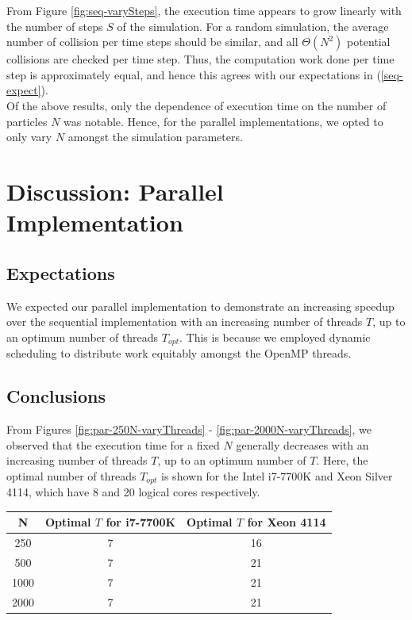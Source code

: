 \documentclass[12pt]{article}
\begin{document}
From Figure \ref{fig:seq-varySteps}, the execution time appears to grow linearly with the number of steps $S$ of the simulation. For a random simulation, the average number of collision per time steps should be similar, and all $\Theta(N^2)$ potential collisions are checked per time step. Thus, the computation work done per time step is approximately equal, and hence this agrees with our expectations in (\ref{seq-expect}). \label{seq-linear-growth-steps} \\

Of the above results, only the dependence of execution time on the number of particles $N$ was notable. Hence, for the parallel implementations, we opted to only vary $N$ amongst the simulation parameters.

\pagebreak

\section{Discussion: Parallel Implementation}

\subsection{Expectations}

We expected our parallel implementation to demonstrate an increasing speedup over the sequential implementation with an increasing number of threads $T$, up to an optimum number of threads $T_{opt}$. This is because we employed dynamic scheduling to distribute work equitably amongst the OpenMP threads.

\subsection{Conclusions}

From Figures \ref{fig:par-250N-varyThreads} - \ref{fig:par-2000N-varyThreads}, we observed that the execution time for a fixed $N$ generally decreases with an increasing number of threads $T$, up to an optimum number of $T$. Here, the optimal number of threads $T_{opt}$ is shown for the Intel i7-7700K and Xeon Silver 4114, which have 8 and 20 logical cores respectively.

\begin{center}
	\begin{tabular}{ | c | c | c | }
		\hline
		N & Optimal $T$ for i7-7700K & Optimal $T$ for Xeon 4114 \\ \hline
		250 & 7 & 16 \\ \hline
		500 & 7 & 21 \\ \hline
		1000 & 7 & 21 \\ \hline
		2000 & 7 & 21 \\ \hline
	\end{tabular}
\end{center}
\end{document}
